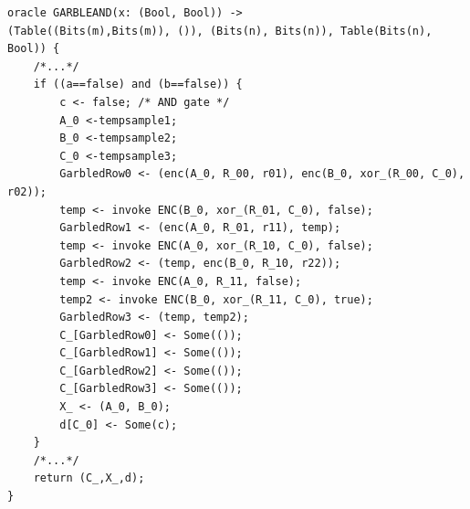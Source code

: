 \begin{longlisting}
\begin{verbatim}
oracle GARBLEAND(x: (Bool, Bool)) -> 
(Table((Bits(m),Bits(m)), ()), (Bits(n), Bits(n)), Table(Bits(n), Bool)) {
    /*...*/
    if ((a==false) and (b==false)) {
        c <- false; /* AND gate */
        A_0 <-tempsample1;
        B_0 <-tempsample2;
        C_0 <-tempsample3;
        GarbledRow0 <- (enc(A_0, R_00, r01), enc(B_0, xor_(R_00, C_0), r02));
        temp <- invoke ENC(B_0, xor_(R_01, C_0), false);
        GarbledRow1 <- (enc(A_0, R_01, r11), temp);
        temp <- invoke ENC(A_0, xor_(R_10, C_0), false);
        GarbledRow2 <- (temp, enc(B_0, R_10, r22)); 
        temp <- invoke ENC(A_0, R_11, false);
        temp2 <- invoke ENC(B_0, xor_(R_11, C_0), true);
        GarbledRow3 <- (temp, temp2);
        C_[GarbledRow0] <- Some(());
        C_[GarbledRow1] <- Some(());
        C_[GarbledRow2] <- Some(());
        C_[GarbledRow3] <- Some(());
        X_ <- (A_0, B_0);
        d[C_0] <- Some(c); 
    }
    /*...*/
    return (C_,X_,d);
} 
\end{verbatim}
\caption{Part of oracle GARBLEAND in Reduction.pkg.ssp}
\label{lst:freexor-pkg-reduction-ora-GARBLEAND}
\end{longlisting}
